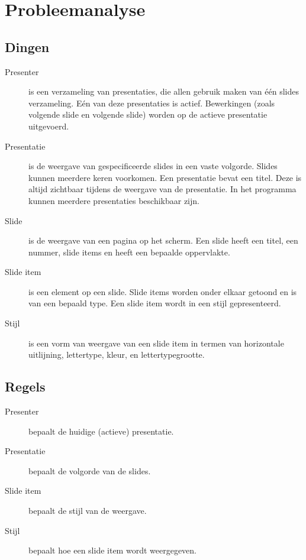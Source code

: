 \documentclass[a4paper]{article}
\begin{document}
\section{Probleemanalyse}
\subsection{Dingen}
\begin{description}
\item[Presenter] is een verzameling van presentaties, die allen gebruik maken van \'e\'en slides verzameling. E\'en van deze presentaties is actief. Bewerkingen (zoals volgende slide en volgende slide) worden op de actieve presentatie uitgevoerd.
\item[Presentatie] is de weergave van gespecificeerde slides in een vaste volgorde. Slides kunnen meerdere keren voorkomen. Een presentatie bevat een titel. Deze is altijd zichtbaar tijdens de weergave van de presentatie. In het programma kunnen meerdere presentaties beschikbaar zijn.
\item[Slide] is de weergave van een pagina op het scherm. Een slide heeft een titel, een nummer, slide items en heeft een bepaalde oppervlakte.
\item[Slide item] is een element op een slide. Slide items worden onder elkaar getoond en is van een bepaald type.
Een slide item wordt in een stijl gepresenteerd.
\item[Stijl] is een vorm van weergave van een slide item in termen van horizontale uitlijning, lettertype, kleur, en lettertypegrootte.
\end{description}

\subsection{Regels}
\begin{description}
\item[Presenter] bepaalt de huidige (actieve) presentatie.
\item[Presentatie] bepaalt de volgorde van de slides.
\item[Slide item] bepaalt de stijl van de weergave.
\item[Stijl] bepaalt hoe een slide item wordt weergegeven. 
\end{description}
\end{document}
